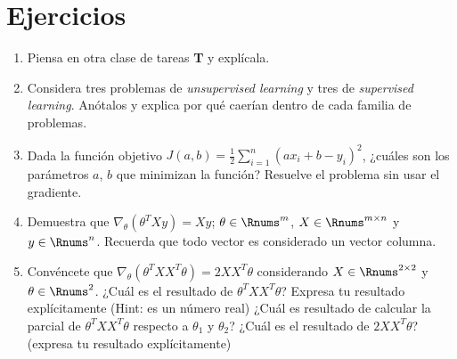 \documentclass[11pt]{article}
\begin{document}
\section*{Ejercicios}
\begin{enumerate}
	\item Piensa en otra clase de tareas \textbf{T} y explícala.
	\item Considera tres problemas de \textit{unsupervised learning} y tres de \textit{supervised learning}. Anótalos y explica por qué caerían dentro de cada familia de problemas.
	\item Dada la función objetivo  $J(a, b) = \frac{1}{2}\sum_{i=1}^n(ax_i + b - y_i)^2$, ¿cuáles son los parámetros $a$, $b$ que minimizan la función? Resuelve el problema sin usar el gradiente.
	\item Demuestra que $\nabla_\theta(\theta^T Xy) = Xy$; $\theta\in\Rnums^m$, $X\in\Rnums^{m\times n}$ y $y\in\Rnums^n$. Recuerda que todo vector es considerado un vector columna.
	\item Convéncete que $\nabla_\theta(\theta^TXX^T\theta) = 2XX^T\theta$ considerando $X\in\Rnums^{2\times 2}$ y $\theta\in\Rnums^2$. ¿Cuál es el resultado de $\theta^TXX^T\theta$? Expresa tu resultado explícitamente (Hint: es un número real) ¿Cuál es resultado de calcular la parcial de $\theta^TXX^T\theta$ respecto a $\theta_1$ y $\theta_2$? ¿Cuál es el resultado de $2XX^T\theta$? (expresa tu resultado explícitamente)
\end{enumerate}
\end{document}
